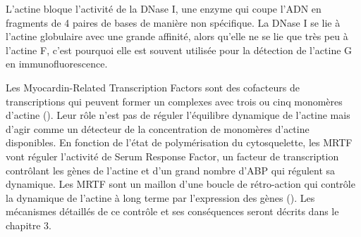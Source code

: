 L'actine bloque l'activité de la DNase I, une enzyme qui coupe l'ADN en fragments de 4 paires de bases de manière non spécifique. La DNase I se lie à l'actine globulaire avec une grande affinité, alors qu'elle ne se lie que très peu à l'actine F, c'est pourquoi elle est souvent utilisée pour la détection de l'actine G en immunofluorescence. 

Les Myocardin-Related Transcription Factors sont des cofacteurs de transcriptions qui peuvent former un complexes avec trois ou cinq monomères d'actine (\cite{mouilleron_molecular_2008}). Leur rôle n'est pas de réguler l'équilibre dynamique de l'actine mais d'agir comme un détecteur de la concentration de monomères d'actine disponibles. 
En fonction de l'état de polymérisation du cytosquelette, les MRTF vont réguler l'activité de Serum Response Factor, un facteur de transcription contrôlant les gènes de l'actine et d'un grand nombre d'ABP qui régulent sa dynamique. 
Les MRTF sont un maillon d'une boucle de rétro-action qui contrôle la dynamique de l'actine à long terme par l'expression des gènes (\cite{salvany_core_2014}). 
Les mécanismes détaillés de ce contrôle et ses conséquences seront décrits dans le chapitre 3. 

